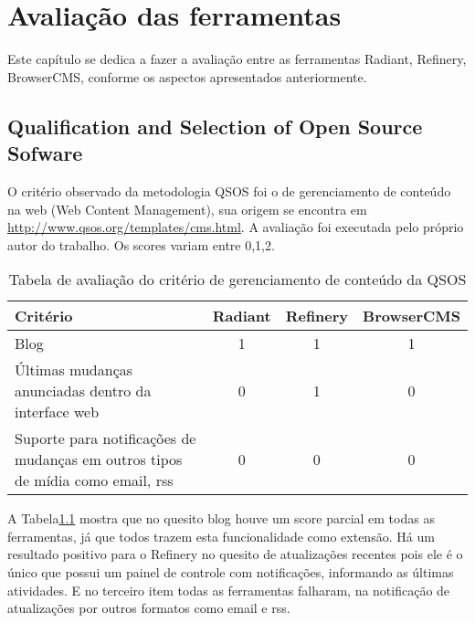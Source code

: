 \chapter{Avaliação das ferramentas}

Este capítulo se dedica a fazer a avaliação entre as ferramentas Radiant, Refinery, BrowserCMS, conforme os aspectos apresentados anteriormente.

\section{Qualification and Selection of Open Source Sofware}

O critério observado da metodologia QSOS foi o de gerenciamento de conteúdo na web (Web Content Management), sua origem se encontra em \url{http://www.qsos.org/templates/cms.html}. A avaliação foi executada pelo próprio autor do trabalho. Os scores variam entre 0,1,2. 

\begin{table}[ht]
\caption{Tabela de avaliação do critério de gerenciamento de conteúdo da QSOS } %
\centering %
\begin{tabular}{p{5.2cm} | c | c | c} %
\hline\hline %
Critério & Radiant & Refinery & BrowserCMS  \\ [0.5ex] %
\hline %
Blog        & 1  & 1   & 1    \\ \hline
Últimas mudanças anunciadas dentro da interface web  & 0 & 1 & 0    \\ \hline
Suporte para notificações de mudanças em outros tipos de mídia como email, rss & 0 & 0 & 0 \\ [1ex] %
\hline %
\end{tabular}
\label{table:qsos_avaliacao_ferramentas} %
\end{table}

A Tabela\ref{table:qsos_avaliacao_ferramentas} mostra que no quesito blog houve um score parcial em todas as ferramentas, já que todos trazem esta funcionalidade como extensão. Há um resultado positivo para o Refinery no quesito de atualizações recentes pois ele é o único que possui um painel de controle com notificações, informando as últimas atividades. E no terceiro item todas as ferramentas falharam, na notificação de atualizações por outros formatos como email e rss.

